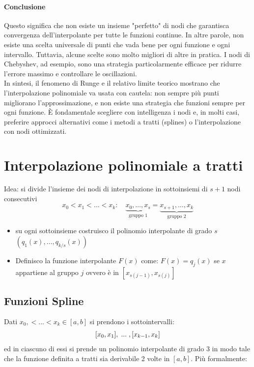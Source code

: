 \documentclass[12pt,a4paper,]{report}
\newcommand{\s}{\hspace{1mm}}
\begin{document}
\paragraph{Conclusione}
Questo significa che non esiste un insieme "perfetto" di nodi che garantisca convergenza dell'interpolante per tutte le funzioni continue. In altre parole, non esiste una scelta universale di punti che vada bene per ogni funzione e ogni intervallo. Tuttavia, alcune scelte sono molto migliori di altre in pratica. I nodi di Chebyshev, ad esempio, sono una strategia particolarmente efficace per ridurre l'errore massimo e controllare le oscillazioni.\\
In sintesi, il fenomeno di Runge e il relativo limite teorico mostrano che l'interpolazione polinomiale va usata con cautela: non sempre più punti migliorano l'approssimazione, e non esiste una strategia che funzioni sempre per ogni funzione. È fondamentale scegliere con intelligenza i nodi e, in molti casi, preferire approcci alternativi come i metodi a tratti (splines) o l'interpolazione con nodi ottimizzati.

\section{Interpolazione polinomiale a tratti}
Idea: si divide l'insieme dei nodi di interpolazione in sottoinsiemi di $s + 1$ nodi consecutivi
\[
x_0 < x_1 < \ldots < x_k: \quad \underbrace{x_0, \ldots, x_s}_{\text{gruppo 1}} = \underbrace{x_{s+1}, \ldots, x_k}_{\text{gruppo 2}}
\]
\begin{itemize}
    \item su ogni sottoinsieme costruisco il polinomio interpolante di grado $s$ $(q_1(x), \ldots, q_{k/s}(x))$
    \item Definisco la funzione interpolante $F(x)$ come: $F(x) = q_j(x)$ se $x$ appartiene al gruppo $j$ ovvero è in $[x_{s(j-1)}, x_{s(j)}]$
\end{itemize}

\subsection{Funzioni Spline}

Dati $x_0,<...<x_k\in [a,b]$ si prendono i sottointervalli:
\[
[x_0,x_1],\s...\s, [x_{k-1}, x_k]
\]
ed in ciascuno di essi si prende un polinomio interpolante di grado 3 in modo tale che la funzione definita a tratti sia derivabile 2 volte in $[a,b]$.
Pi\`u formalmente:
\end{document}
